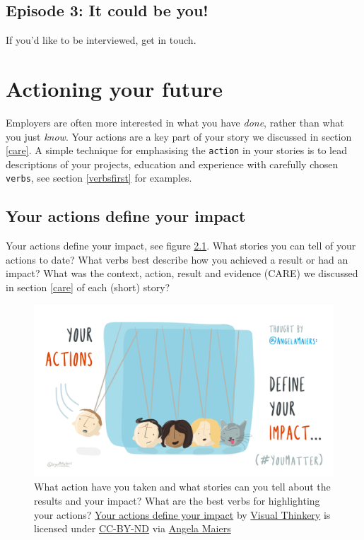 \documentclass[
]{book}
\begin{document}
\hypertarget{episode-3-it-could-be-you}{%
\section{Episode 3: It could be you!}\label{episode-3-it-could-be-you}}

If you'd like to be interviewed, get in touch.

\hypertarget{actioning}{%
\chapter{Actioning your future}\label{actioning}}

Employers are often more interested in what you have \emph{done}, rather than what you just \emph{know}. Your actions are a key part of your story we discussed in section \ref{care}. A simple technique for emphasising the \texttt{action} in your stories is to lead descriptions of your projects, education and experience with carefully chosen \texttt{verbs}, see section \ref{verbsfirst} for examples.

\hypertarget{impact}{%
\section{Your actions define your impact}\label{impact}}

Your actions define your impact, see figure \ref{fig:action-fig}. What stories you can tell of your actions to date? What verbs best describe how you achieved a result or had an impact? What was the context, action, result and evidence (CARE) we discussed in section \ref{care} of each (short) story?

\begin{figure}

{\centering \includegraphics[width=1\linewidth]{images/your-actions} 

}

\caption{What action have you taken and what stories can you tell about the results and your impact? What are the best verbs for highlighting your actions? \href{https://bryanmmathers.com/your-actions-define-your-impact/}{Your actions define your impact} by \href{https://visualthinkery.com/}{Visual Thinkery} is licensed under \href{https://creativecommons.org/licenses/by-nd/4.0/}{CC-BY-ND} via \href{https://twitter.com/AngelaMaiers}{Angela Maiers}}\label{fig:action-fig}
\end{figure}
\end{document}
